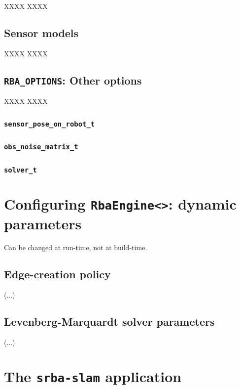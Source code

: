 \documentclass[a4paper,11pt]{article}
\begin{document}
XXXX XXXX 


\subsection{Sensor models}
\label{sect:program_sensors}

XXXX XXXX 


\subsection{\texttt{RBA\_OPTIONS}: Other options}
\label{sect:rba_options}

XXXX XXXX 


\subsubsection{\texttt{sensor\_pose\_on\_robot\_t}}


\subsubsection{\texttt{obs\_noise\_matrix\_t}}


\subsubsection{\texttt{solver\_t}}


\section{Configuring \texttt{RbaEngine<>}: dynamic parameters}
\label{sect:rba_dyn_parameters}

Can be changed at run-time, not at build-time.

\subsection{Edge-creation policy}
\label{sect:edge.policy}

(...)

\subsection{Levenberg-Marquardt solver parameters}
\label{sect:lm-params}

(...)



\section{The \texttt{srba-slam} application}
\label{sect:srba_slam_app}
\end{document}
